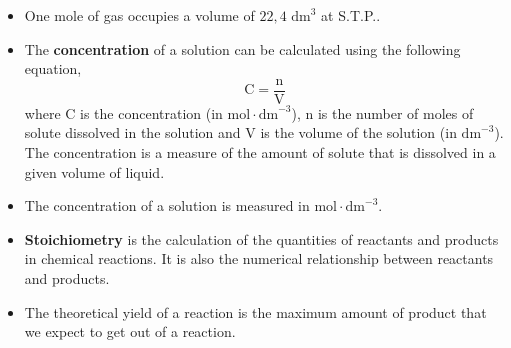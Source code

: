 \begin{itemize}[noitemsep]
\item One mole of gas occupies a volume of $22,4 {\text{ dm}}^{3}$ at S.T.P..
\item The \textbf{concentration} of a solution can be calculated using the following equation,
\label{m38712*id286019}\nopagebreak\noindent{}
    \begin{equation*}
    \text{C}=\frac{\text{n}}{\text{V}}
      \end{equation*}
where C is the concentration (in $\text{mol} \cdot {\text{dm}}^{-3}$), n is the number of moles of solute dissolved in the solution and V is the volume of the solution (in ${\text{dm}}^{-3}$). The concentration is a measure of the amount of solute that is dissolved in a given volume of liquid.
\item The concentration of a solution is measured in $\text{mol} \cdot {\text{dm}}^{-3}$.
\item \textbf{Stoichiometry} is the calculation of the quantities of reactants and products in chemical reactions. It is also the numerical relationship between reactants and products.
\item The theoretical yield of a reaction is the maximum amount of product that we expect to get out of a reaction.\end{itemize}
\label{m38712*secfhsst!!!underscore!!!id2334}
